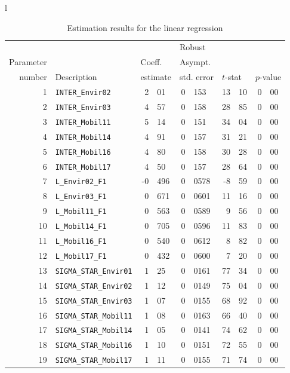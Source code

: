 \documentclass[12pt,a4paper]{article}
\begin{document}
\begin{table}[htb]
\caption{\label{tab:regression}Estimation results for the linear regression}
  \begin{tabular}{l}
\begin{tabular}{rlr@{.}lr@{.}lr@{.}lr@{.}l}
         &                       &   \multicolumn{2}{l}{}    & \multicolumn{2}{l}{Robust}  &     \multicolumn{4}{l}{}   \\
Parameter &                       &   \multicolumn{2}{l}{Coeff.}      & \multicolumn{2}{l}{Asympt.}  &     \multicolumn{4}{l}{}   \\
number &  Description                     &   \multicolumn{2}{l}{estimate}      & \multicolumn{2}{l}{std. error}  &   \multicolumn{2}{l}{$t$-stat}  &   \multicolumn{2}{l}{$p$-value}   \\

\hline

1 & \lstinline$INTER_Envir02$ & 2&01 & 0&153 & 13&10 & 0&00\\
2 & \lstinline$INTER_Envir03$ & 4&57 & 0&158 & 28&85 & 0&00\\
3 & \lstinline$INTER_Mobil11$ & 5&14 & 0&151 & 34&04 & 0&00\\
4 & \lstinline$INTER_Mobil14$ & 4&91 & 0&157 & 31&21 & 0&00\\
5 & \lstinline$INTER_Mobil16$ & 4&80 & 0&158 & 30&28 & 0&00\\
6 & \lstinline$INTER_Mobil17$ & 4&50 & 0&157 & 28&64 & 0&00\\
7 & \lstinline$L_Envir02_F1$ & -0&496 & 0&0578 & -8&59 & 0&00\\
8 & \lstinline$L_Envir03_F1$ & 0&671 & 0&0601 & 11&16 & 0&00\\
9 & \lstinline$L_Mobil11_F1$ & 0&563 & 0&0589 & 9&56 & 0&00\\
10 & \lstinline$L_Mobil14_F1$ & 0&705 & 0&0596 & 11&83 & 0&00\\
11 & \lstinline$L_Mobil16_F1$ & 0&540 & 0&0612 & 8&82 & 0&00\\
12 & \lstinline$L_Mobil17_F1$ & 0&432 & 0&0600 & 7&20 & 0&00\\
13 & \lstinline$SIGMA_STAR_Envir01$ & 1&25 & 0&0161 & 77&34 & 0&00\\
14 & \lstinline$SIGMA_STAR_Envir02$ & 1&12 & 0&0149 & 75&04 & 0&00\\
15 & \lstinline$SIGMA_STAR_Envir03$ & 1&07 & 0&0155 & 68&92 & 0&00\\
16 & \lstinline$SIGMA_STAR_Mobil11$ & 1&08 & 0&0163 & 66&40 & 0&00\\
17 & \lstinline$SIGMA_STAR_Mobil14$ & 1&05 & 0&0141 & 74&62 & 0&00\\
18 & \lstinline$SIGMA_STAR_Mobil16$ & 1&10 & 0&0151 & 72&55 & 0&00\\
19 & \lstinline$SIGMA_STAR_Mobil17$ & 1&11 & 0&0155 & 71&74 & 0&00\\
\end{tabular}
  \end{tabular}
\end{table}
\end{document}
